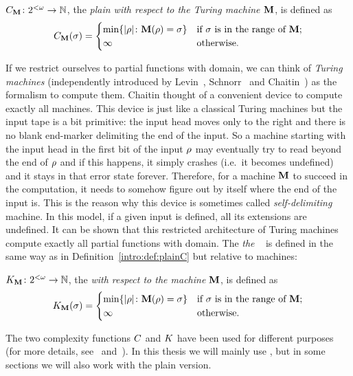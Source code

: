 \begin{definicion}\label{intro:def:plainC}
$C_{{\bf M}}\colon2^{<\omega} \to \mathbb{N}$, 
the {\em plain
\kolcomp with respect to the Turing machine ${\bf M}$}, is defined as
$$
C_{{\bf M}}(\sigma)=
    \begin{cases}
    \min \{| \rho |\colon {\bf M}(\rho)=\sigma \} & \textrm{if $\sigma$ is in the range of ${\bf M}$};\\
    \infty & \textrm{otherwise.}
    \end{cases}
$$
\end{definicion}
If we restrict ourselves to partial \rec functions with \pfree
domain, we can think of  {\em
\pfree Turing machines} (independently introduced by
Levin~\cite{L71,L73}, Schnorr~\cite{S71} and Chaitin~\cite{chaitin1975theory})
as the formalism to compute them. Chaitin thought of a convenient
device to compute exactly all \pfree machines. This device is just
like a classical Turing machines but the input tape is a bit
primitive: the input head moves only to the right and there is no
blank end-marker delimiting the end of the input. So a \pfree
machine starting with the input head in the first bit of the input
$\rho$ may eventually try to read beyond the end of $\rho$ and if
this happens, it simply crashes (i.e.\ it becomes undefined) and
it stays in that error state forever. Therefore, for a \pfree
machine ${\bf M}$ to succeed in the computation, it needs to somehow
figure out by itself where the end of the input is.
This is the reason why this device is sometimes called {\em
self-delimiting} machine. In this model, if a given input is
defined, all its extensions are undefined. It can be shown that
this restricted architecture of Turing machines compute exactly
all partial \rec functions with \pfree domain. The {\em the \pfree
\kolcomp}~\cite{levin1974laws,G74,chaitin1975theory} is defined in the same way as in
Definition~\ref{intro:def:plainC} but relative to \pfree
machines:

\begin{definicion}[\Pfree \kolcomp]\label{intro:def:prefixK}
\glossary{$\KM$}$K_{{\bf M}}\colon2^{<\omega} \to \mathbb{N}$, the {\em \pfree
\kolcomp with respect to the \pfree machine ${\bf M}$}, is defined as
$$
K_{{\bf M}}(\sigma)=
    \begin{cases}
    \min \{| \rho |\colon {\bf M}(\rho)=\sigma \} & \textrm{if $\sigma$ is in the range of ${\bf M}$};\\
    \infty & \textrm{otherwise.}
    \end{cases}
$$
\end{definicion}
The two complexity functions $C$ and $K$ have been used for
different purposes
(for more details, see~\cite{DHBook} and~\cite{LV97}). In this
thesis we will mainly use \pfree \kolcomp, but in some sections we
will also work with the plain version.

